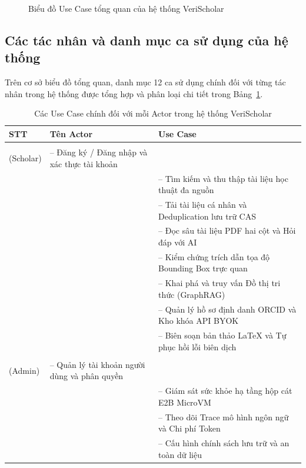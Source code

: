 \begin{figure}[!htbp]
\caption{Biểu đồ Use Case tổng quan của hệ thống VeriScholar}
\label{fig:usecase_overview}
\end{figure}

\subsection{Các tác nhân và danh mục ca sử dụng của hệ thống}
\label{sec:tac_nhan_usecase}

Trên cơ sở biểu đồ tổng quan, danh mục 12 ca sử dụng chính đối với từng tác nhân trong hệ thống \VS được tổng hợp và phân loại chi tiết trong Bảng~\ref{tab:actors_usecases}.

\begin{table}[!htbp]
\centering
\caption{Các Use Case chính đối với mỗi Actor trong hệ thống VeriScholar}
\label{tab:actors_usecases}
\setlength{\tabcolsep}{6pt}
\renewcommand{\arraystretch}{1.20}
\begin{tabularx}{\textwidth}{|>{\centering\arraybackslash}m{1.2cm}|>{\centering\arraybackslash}m{3.8cm}|>{\raggedright\arraybackslash}X|}
\hline
\textbf{STT} & \textbf{Tên Actor} & \centering\textbf{Use Case} \tabularnewline
\hline
\multirow{8}{=}{\centering 1} & \multirow{8}{=}{\centering Học giả\\(Scholar)} & -- Đăng ký / Đăng nhập và xác thực tài khoản \\ \cline{3-3}
& & -- Tìm kiếm và thu thập tài liệu học thuật đa nguồn \\ \cline{3-3}
& & -- Tải tài liệu cá nhân và Deduplication lưu trữ CAS \\ \cline{3-3}
& & -- Đọc sâu tài liệu PDF hai cột và Hỏi đáp với AI \\ \cline{3-3}
& & -- Kiểm chứng trích dẫn tọa độ Bounding Box trực quan \\ \cline{3-3}
& & -- Khai phá và truy vấn Đồ thị tri thức (GraphRAG) \\ \cline{3-3}
& & -- Quản lý hồ sơ định danh ORCID và Kho khóa API BYOK \\ \cline{3-3}
& & -- Biên soạn bản thảo LaTeX và Tự phục hồi lỗi biên dịch \\
\hline
\multirow{4}{=}{\centering 2} & \multirow{4}{=}{\centering Quản trị viên\\(Admin)} & -- Quản lý tài khoản người dùng và phân quyền \\ \cline{3-3}
& & -- Giám sát sức khỏe hạ tầng hộp cát E2B MicroVM \\ \cline{3-3}
& & -- Theo dõi Trace mô hình ngôn ngữ và Chi phí Token \\ \cline{3-3}
& & -- Cấu hình chính sách lưu trữ và an toàn dữ liệu \\
\hline
\end{tabularx}
\end{table}

